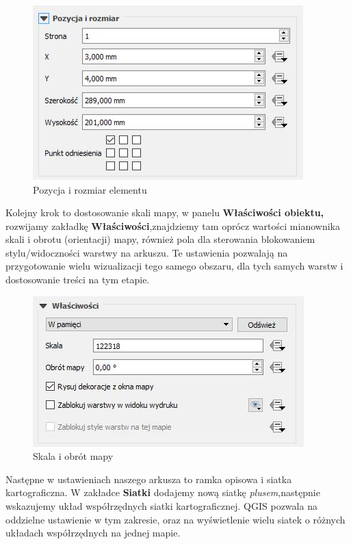 \documentclass[12pt,a4paper]{book}
\begin{document}
\begin{center}
\begin{figure}
\includegraphics[width=10.453cm,height=6.745cm]{008-pozycja.jpg}
\caption{Pozycja i rozmiar elementu}
\end{figure}
\end{center}
Kolejny krok to dostosowanie skali mapy, w panelu \textbf{Właściwości obiektu,} rozwijamy zakładkę \textbf{Właściwości},znajdziemy tam oprócz wartości mianownika skali i obrotu (orientacji) mapy, również pola dla sterowania blokowaniem stylu/widoczności warstwy na arkuszu. Te ustawienia pozwalają na przygotowanie wielu wizualizacji tego samego obszaru, dla tych samych warstw i dostosowanie treści na tym etapie. 

\begin{center}
\begin{figure}
\includegraphics[width=10.478cm,height=5.821cm]{008-wlasciwosci.jpg}
\caption{Skala i obrót mapy}
\end{figure}
\end{center}
Następne w ustawieniach naszego arkusza to ramka opisowa i siatka kartograficzna. W zakładce \textbf{Siatki }dodajemy nową siatkę \textit{plusem},następnie wskazujemy układ współrzędnych siatki kartograficznej. QGIS pozwala na oddzielne ustawienie w tym zakresie, oraz na wyświetlenie wielu siatek o różnych układach współrzędnych na jednej mapie.
\end{document}
